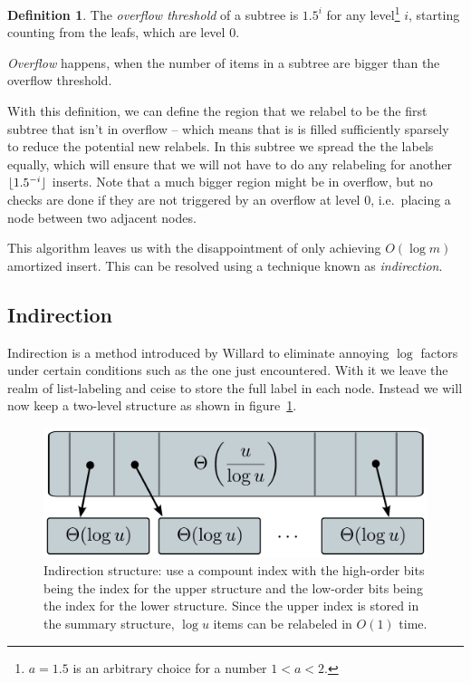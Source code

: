 \documentclass[11pt]{Thesis}
\DeclarePairedDelimiter\floor{\lfloor}{\rfloor}
\theoremstyle{definition}
\newtheorem*{defn}{Definition}
\newcommand{\Figref}[1]{figure~\ref{fig:#1}}
\newcommand{\figlabel}[1]{\label{fig:#1}}
\begin{document}
\begin{defn}
  The \emph{overflow threshold} of a subtree is $1.5^i$ for any 
  level\footnote{$a=1.5$ is an arbitrary choice for a number $1 < a < 2$.} $i$, 
  starting counting from the leafs, which are level 0.

  \emph{Overflow} happens, when the number of items in a subtree are bigger 
  than the overflow threshold.
\end{defn}

With this definition, we can define the region that we relabel to be the 
first subtree that isn't in overflow -- which means that is is filled 
sufficiently sparsely to reduce the potential new relabels. In this subtree 
we spread the the labels equally, which will ensure that we will not have to 
do any relabeling for another $\floor{1.5^{-i}}$ inserts. Note that a much 
bigger region might be in overflow, but no checks are done if they are not 
triggered by an overflow at level 0, i.e.\ placing a node between two adjacent
nodes.

This algorithm leaves us with the disappointment of only achieving $O(\log m)$ 
amortized insert. This can be resolved using a technique known as 
\emph{indirection}.

\subsection{Indirection}
Indirection is a method introduced by Willard\cite{Will82a} to eliminate
annoying $\log$ factors under certain conditions such as the one just
encountered.  With it we leave the realm of list-labeling and ceise to store
the full label in each node. Instead we will now keep a two-level structure 
as shown in \Figref{graphs/indirection}.

\begin{figure}[htpb]
  \centering
  \includegraphics[width=0.8\linewidth]{graphs/indirection}
  \caption{Indirection structure: use a compount index with the high-order 
  bits being the index for the upper structure and the low-order bits being 
the index for the lower structure. Since the upper index is stored in the 
summary structure, $\log u$ items can be relabeled in $O(1)$ time.}
  \figlabel{graphs/indirection}
\end{figure}
\end{document}

